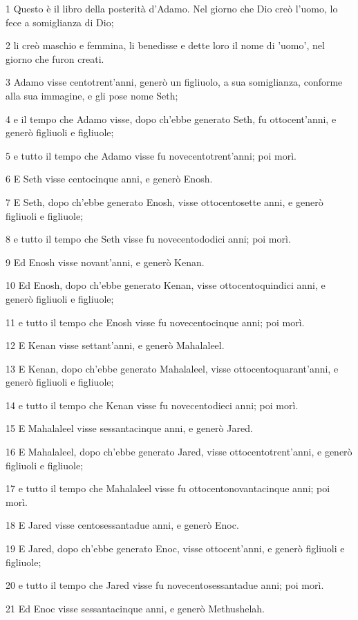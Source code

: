 \par 1 Questo è il libro della posterità d'Adamo. Nel giorno che Dio creò l'uomo, lo fece a somiglianza di Dio;
\par 2 li creò maschio e femmina, li benedisse e dette loro il nome di 'uomo', nel giorno che furon creati.
\par 3 Adamo visse centotrent'anni, generò un figliuolo, a sua somiglianza, conforme alla sua immagine, e gli pose nome Seth;
\par 4 e il tempo che Adamo visse, dopo ch'ebbe generato Seth, fu ottocent'anni, e generò figliuoli e figliuole;
\par 5 e tutto il tempo che Adamo visse fu novecentotrent'anni; poi morì.
\par 6 E Seth visse centocinque anni, e generò Enosh.
\par 7 E Seth, dopo ch'ebbe generato Enosh, visse ottocentosette anni, e generò figliuoli e figliuole;
\par 8 e tutto il tempo che Seth visse fu novecentododici anni; poi morì.
\par 9 Ed Enosh visse novant'anni, e generò Kenan.
\par 10 Ed Enosh, dopo ch'ebbe generato Kenan, visse ottocentoquindici anni, e generò figliuoli e figliuole;
\par 11 e tutto il tempo che Enosh visse fu novecentocinque anni; poi morì.
\par 12 E Kenan visse settant'anni, e generò Mahalaleel.
\par 13 E Kenan, dopo ch'ebbe generato Mahalaleel, visse ottocentoquarant'anni, e generò figliuoli e figliuole;
\par 14 e tutto il tempo che Kenan visse fu novecentodieci anni; poi morì.
\par 15 E Mahalaleel visse sessantacinque anni, e generò Jared.
\par 16 E Mahalaleel, dopo ch'ebbe generato Jared, visse ottocentotrent'anni, e generò figliuoli e figliuole;
\par 17 e tutto il tempo che Mahalaleel visse fu ottocentonovantacinque anni; poi morì.
\par 18 E Jared visse centosessantadue anni, e generò Enoc.
\par 19 E Jared, dopo ch'ebbe generato Enoc, visse ottocent'anni, e generò figliuoli e figliuole;
\par 20 e tutto il tempo che Jared visse fu novecentosessantadue anni; poi morì.
\par 21 Ed Enoc visse sessantacinque anni, e generò Methushelah.
